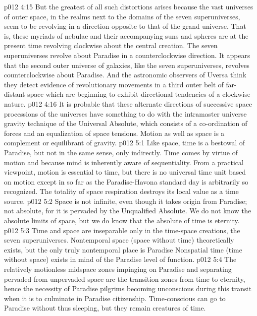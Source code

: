 \vs p012 4:15 But the greatest of all such distortions arises because the vast universes of outer space, in the realms next to the domains of the seven superuniverses, seem to be revolving in a direction opposite to that of the grand universe. That is, these myriads of nebulae and their accompanying suns and spheres are at the present time revolving clockwise about the central creation. The seven superuniverses revolve about Paradise in a counterclockwise direction. It appears that the second outer universe of galaxies, like the seven superuniverses, revolves counterclockwise about Paradise. And the astronomic observers of Uversa think they detect evidence of revolutionary movements in a third outer belt of far\hyp{}distant space which are beginning to exhibit directional tendencies of a clockwise nature.
\vs p012 4:16 It is probable that these alternate directions of successive space processions of the universes have something to do with the intramaster universe gravity technique of the Universal Absolute, which consists of a co\hyp{}ordination of forces and an equalization of space tensions. Motion as well as space is a complement or equilibrant of gravity.
\vs p012 5:1 Like space, time is a bestowal of Paradise, but not in the same sense, only indirectly. Time comes by virtue of motion and because mind is inherently aware of sequentiality. From a practical viewpoint, motion is essential to time, but there is no universal time unit based on motion except in so far as the Paradise\hyp{}Havona standard day is arbitrarily so recognized. The totality of space respiration destroys its local value as a time source.
\vs p012 5:2 Space is not infinite, even though it takes origin from Paradise; not absolute, for it is pervaded by the Unqualified Absolute. We do not know the absolute limits of space, but we do know that the absolute of time is eternity.
\vs p012 5:3 \pc Time and space are inseparable only in the time\hyp{}space creations, the seven superuniverses. Nontemporal space (space without time) theoretically exists, but the only truly nontemporal place is Paradise  Nonspatial time (time without space) exists in mind of the Paradise level of function.
\vs p012 5:4 The relatively motionless midspace zones impinging on Paradise and separating pervaded from unpervaded space are the transition zones from time to eternity, hence the necessity of Paradise pilgrims becoming unconscious during this transit when it is to culminate in Paradise citizenship. Time\hyp{}conscious  can go to Paradise without thus sleeping, but they remain creatures of time.
